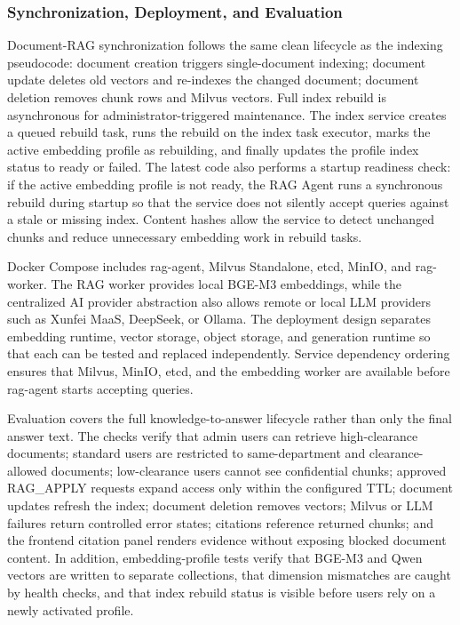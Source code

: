\subsubsection{Synchronization, Deployment, and Evaluation}

Document-RAG synchronization follows the same clean lifecycle as the indexing pseudocode: document creation triggers single-document indexing; document update deletes old vectors and re-indexes the changed document; document deletion removes chunk rows and Milvus vectors. Full index rebuild is asynchronous for administrator-triggered maintenance. The index service creates a queued rebuild task, runs the rebuild on the index task executor, marks the active embedding profile as rebuilding, and finally updates the profile index status to ready or failed. The latest code also performs a startup readiness check: if the active embedding profile is not ready, the RAG Agent runs a synchronous rebuild during startup so that the service does not silently accept queries against a stale or missing index. Content hashes allow the service to detect unchanged chunks and reduce unnecessary embedding work in rebuild tasks.

Docker Compose includes rag-agent, Milvus Standalone, etcd, MinIO, and rag-worker. The RAG worker provides local BGE-M3 embeddings, while the centralized AI provider abstraction also allows remote or local LLM providers such as Xunfei MaaS, DeepSeek, or Ollama. The deployment design separates embedding runtime, vector storage, object storage, and generation runtime so that each can be tested and replaced independently. Service dependency ordering ensures that Milvus, MinIO, etcd, and the embedding worker are available before rag-agent starts accepting queries.

Evaluation covers the full knowledge-to-answer lifecycle rather than only the final answer text. The checks verify that admin users can retrieve high-clearance documents; standard users are restricted to same-department and clearance-allowed documents; low-clearance users cannot see confidential chunks; approved RAG\_APPLY requests expand access only within the configured TTL; document updates refresh the index; document deletion removes vectors; Milvus or LLM failures return controlled error states; citations reference returned chunks; and the frontend citation panel renders evidence without exposing blocked document content. In addition, embedding-profile tests verify that BGE-M3 and Qwen vectors are written to separate collections, that dimension mismatches are caught by health checks, and that index rebuild status is visible before users rely on a newly activated profile.

